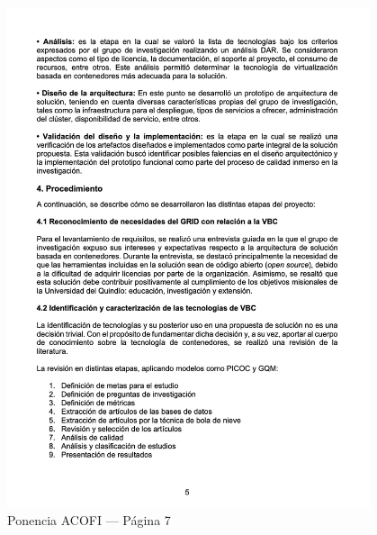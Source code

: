 \begin{figure}[H]
    \centering
    \begin{tcolorbox}[
        colback=white,
        colframe=gray!50,
        boxrule=1pt,
        arc=2pt,
        boxsep=5pt,
        left=3pt,
        right=3pt,
        top=3pt,
        bottom=3pt,
        drop shadow
    ]
        \includegraphics[width=0.95\textwidth,keepaspectratio]{apendices/ACOFI/pagina_7.png}
    \end{tcolorbox}
    \caption{Ponencia ACOFI --- Página 7}\label{fig:acofi-pagina-7}
\end{figure}
\FloatBarrier%
